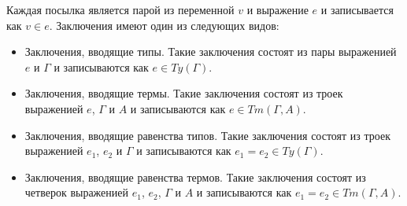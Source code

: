 \documentclass{amsart}
\theoremstyle{definition}
\theoremstyle{remark}
\numberwithin{figure}{section}
\begin{document}
Каждая посылка является парой из переменной $v$ и выражение $e$ и записывается как $v \in e$.
Заключения имеют один из следующих видов:
\begin{itemize}
\item Заключения, вводящие типы. Такие заключения состоят из пары выраженией $e$ и $\Gamma$ и записываются как $e \in Ty(\Gamma)$.
\item Заключения, вводящие термы. Такие заключения состоят из троек выраженией $e$, $\Gamma$ и $A$ и записываются как $e \in Tm(\Gamma, A)$.
\item Заключения, вводящие равенства типов. Такие заключения состоят из троек выраженией $e_1$, $e_2$ и $\Gamma$ и записываются как $e_1 = e_2 \in Ty(\Gamma)$.
\item Заключения, вводящие равенства термов. Такие заключения состоят из четверок выраженией $e_1$, $e_2$, $\Gamma$ и $A$ и записываются как $e_1 = e_2 \in Tm(\Gamma, A)$.
\end{itemize}



\end{document}
